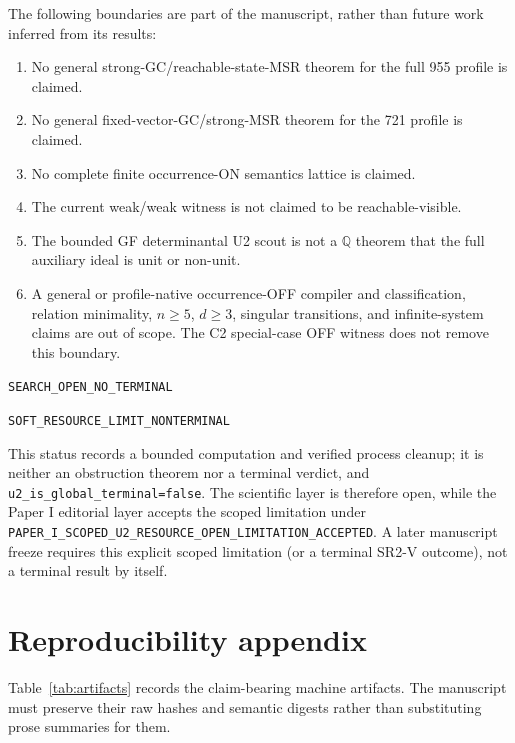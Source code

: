 \documentclass[11pt]{article}
\theoremstyle{definition}
\theoremstyle{remark}
\newcommand{\QQ}{\mathbb{Q}}
\begin{document}
The following boundaries are part of the manuscript, rather than future
work inferred from its results:
\begin{enumerate}[label=N\arabic*.]
  \item No general strong-GC/reachable-state-MSR theorem for the full
        955 profile is claimed.
  \item No general fixed-vector-GC/strong-MSR theorem for the 721 profile
        is claimed.
  \item No complete finite occurrence-ON semantics lattice is claimed.
  \item The current weak/weak witness is not claimed to be
        reachable-visible.
  \item The bounded GF determinantal U2 scout is not a \(\QQ\) theorem that
        the full auxiliary ideal is unit or non-unit.
  \item A general or profile-native occurrence-OFF compiler and
        classification, relation minimality, \(n\geq5\), \(d\geq3\), singular
        transitions, and infinite-system claims are out of scope.  The C2
        special-case OFF witness does not remove this boundary.
\end{enumerate}

\begin{description}[style=nextline]
  \item[Global SR2-V status remains]
        \texttt{SEARCH\_OPEN\_NO\_TERMINAL}
  \item[U2 subroute status]
        \texttt{SOFT\_RESOURCE\_LIMIT\_NONTERMINAL}

        This status records a bounded computation and verified process cleanup;
        it is neither an obstruction theorem nor a terminal verdict, and
        \texttt{u2\_is\_global\_terminal=false}.  The scientific layer is
        therefore open, while the Paper I editorial layer accepts the scoped
        limitation under
        \texttt{PAPER\_I\_SCOPED\_U2\_RESOURCE\_OPEN\_LIMITATION\_ACCEPTED}.
        A later manuscript freeze requires this explicit scoped limitation (or
        a terminal SR2-V outcome), not a terminal result by itself.
\end{description}

\section{Reproducibility appendix}

Table~\ref{tab:artifacts} records the claim-bearing machine artifacts.  The
manuscript must preserve their raw hashes and semantic digests rather than
substituting prose summaries for them.
\end{document}
